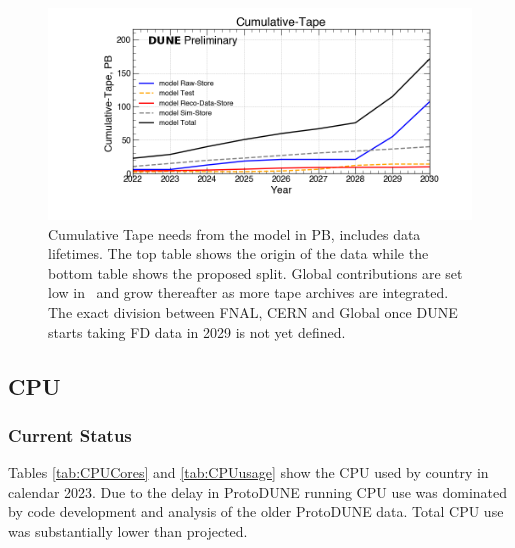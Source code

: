 \documentclass[12pt]{article}
\begin{document}
\begin{figure}[h]
\centering\includegraphics[height=0.4\textwidth]{NearTerm_2024-02-05-2030_noMWC/NearTerm_2024-02-05-2030_noMWC-Cumulative-Tape.png}

\caption{Cumulative Tape needs from the model in PB, includes data lifetimes.  The top table shows the origin of the data while the bottom table  shows the proposed split.  Global contributions are set low in \ThisYear\ and grow thereafter as more tape archives are integrated. The exact division between FNAL, CERN and Global once DUNE starts taking FD data in 2029 is not yet defined.  
 }\label{fig:Cumulative-Tape}
\end{figure}



\clearpage
\subsection{CPU }

\subsubsection{Current Status}
Tables \ref{tab:CPUCores} and \ref{tab:CPUusage} show the CPU used by country  in calendar 2023.  Due to the delay in ProtoDUNE running CPU use was dominated by code development and analysis of the older ProtoDUNE data.   Total CPU use was substantially lower than projected.

\end{document}
